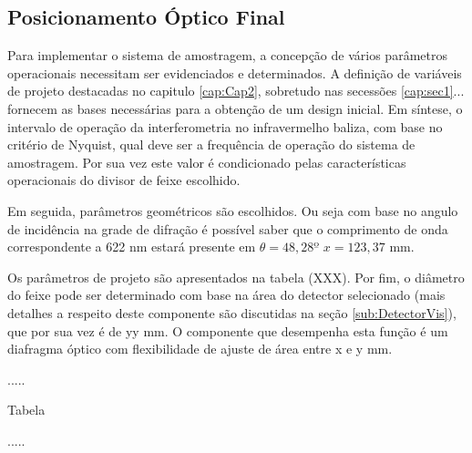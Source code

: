 \documentclass[oneside,openright,12pt]{ufsm_2021} %
\begin{document}
        \subsection{Posicionamento Óptico Final}
            \par Para implementar o sistema de amostragem, a concepção de vários parâmetros operacionais necessitam ser evidenciados e determinados. A definição de variáveis de projeto destacadas no capitulo \ref{cap:Cap2}, sobretudo nas secessões \ref{cap:sec1}... fornecem as bases necessárias para a obtenção de um design inicial. Em síntese, o intervalo de operação da interferometria no infravermelho baliza, com base no critério de Nyquist, qual deve ser a frequência de operação do sistema de amostragem. Por sua vez este valor é condicionado pelas características operacionais do divisor de feixe escolhido. 
            \par Em seguida, parâmetros geométricos são escolhidos. Ou seja com base no angulo de incidência na grade de difração é possível saber que o comprimento de onda correspondente a 622 nm estará presente
            em $\theta= 48,28º$ $x=123,37$ mm.
            \par Os parâmetros de projeto são apresentados na tabela (XXX). Por fim, o diâmetro do feixe pode ser determinado com base na área do detector selecionado (mais detalhes a respeito deste componente são discutidas na seção \ref{sub:DetectorVis}), que por sua vez é de yy mm. O componente que desempenha esta função é um diafragma óptico com flexibilidade de ajuste de área entre x e y mm. 
            
            \par .....
            \par Tabela
            \par .....
        
\end{document}
